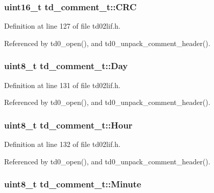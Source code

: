 \subsubsection[{\texorpdfstring{C\+RC}{CRC}}]{\setlength{\rightskip}{0pt plus 5cm}uint16\+\_\+t td\+\_\+comment\+\_\+t\+::\+C\+RC}\hypertarget{structtd__comment__t_a4bcc6435d5a4408627be9f50ef124211}{}\label{structtd__comment__t_a4bcc6435d5a4408627be9f50ef124211}


Definition at line 127 of file td02lif.\+h.



Referenced by td0\+\_\+open(), and td0\+\_\+unpack\+\_\+comment\+\_\+header().

\subsubsection[{\texorpdfstring{Day}{Day}}]{\setlength{\rightskip}{0pt plus 5cm}uint8\+\_\+t td\+\_\+comment\+\_\+t\+::\+Day}\hypertarget{structtd__comment__t_ab42475ed36aa4475f76336099fd53acc}{}\label{structtd__comment__t_ab42475ed36aa4475f76336099fd53acc}


Definition at line 131 of file td02lif.\+h.



Referenced by td0\+\_\+open(), and td0\+\_\+unpack\+\_\+comment\+\_\+header().

\subsubsection[{\texorpdfstring{Hour}{Hour}}]{\setlength{\rightskip}{0pt plus 5cm}uint8\+\_\+t td\+\_\+comment\+\_\+t\+::\+Hour}\hypertarget{structtd__comment__t_ae42f4895a24dadba8528e32d89d601c6}{}\label{structtd__comment__t_ae42f4895a24dadba8528e32d89d601c6}


Definition at line 132 of file td02lif.\+h.



Referenced by td0\+\_\+open(), and td0\+\_\+unpack\+\_\+comment\+\_\+header().

\subsubsection[{\texorpdfstring{Minute}{Minute}}]{\setlength{\rightskip}{0pt plus 5cm}uint8\+\_\+t td\+\_\+comment\+\_\+t\+::\+Minute}\hypertarget{structtd__comment__t_a40d01b0af51b4896e0d771e8a458ed87}{}\label{structtd__comment__t_a40d01b0af51b4896e0d771e8a458ed87}


